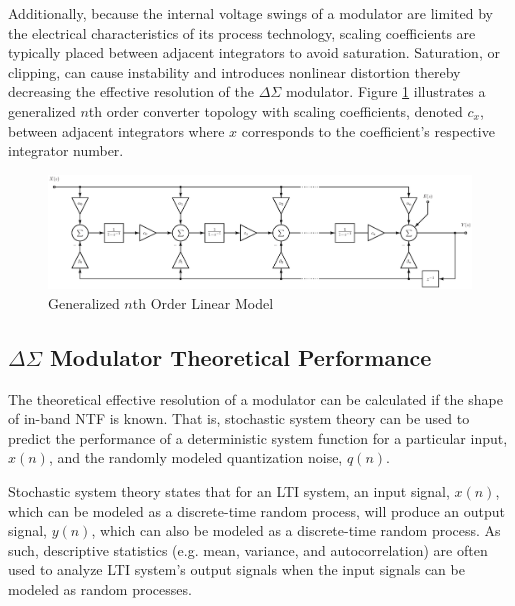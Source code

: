 Additionally, because the internal voltage swings of a \DS modulator are limited by the
electrical characteristics of its process technology, scaling coefficients are
typically placed between adjacent integrators to avoid saturation. Saturation, or
clipping, can cause instability and introduces nonlinear distortion thereby decreasing
the effective resolution of the $\Delta\Sigma$ modulator. Figure
\ref{fig:linear_z_model_nth_order} illustrates a generalized $n$th order converter
topology with scaling coefficients, denoted $c_x$, between adjacent integrators where $x$
corresponds to the coefficient's respective integrator number.
\begin{figure}
  \centering
  \includegraphics[width=\textwidth]{./final_figures/general_nth_order_2.eps}
  \caption{Generalized $n$th Order Linear Model}
  \label{fig:linear_z_model_nth_order}
\end{figure}

\subsection[Delta Sigma Modulator Theoretical Performance]
{$\Delta\Sigma$ Modulator Theoretical Performance}
The theoretical effective resolution of a \DS modulator can be calculated if the shape of
in-band NTF is known. That is, stochastic system theory can be used to predict the
performance of a deterministic system function for a particular input, $x(n)$, and
the randomly modeled quantization noise, $q(n)$. 

Stochastic system theory states that for an LTI system, an input signal, $x(n)$, which
can be modeled as a discrete-time random process, will produce an output
signal, $y(n)$, which can also be modeled as a discrete-time random
process\cite{papoulis_probability_1984}. As such, descriptive statistics (e.g. mean,
variance, and autocorrelation) are often used to analyze LTI system's output signals when
the input signals can be modeled as random processes.

